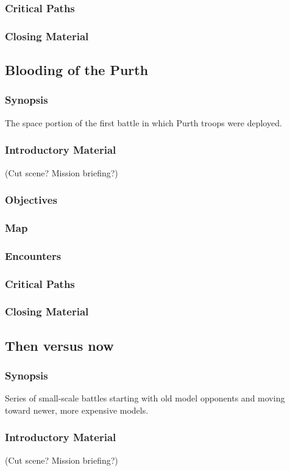 \subsubsection{Critical Paths}
\subsubsection{Closing Material}

\subsection{Blooding of the Purth}
\subsubsection{Synopsis}
The space portion of the first battle in which Purth troops were deployed.
\subsubsection{Introductory Material}
 (Cut scene?  Mission briefing?)
\subsubsection{Objectives}
\subsubsection{Map}
\subsubsection{Encounters}
\subsubsection{Critical Paths}
\subsubsection{Closing Material}

\subsection{Then versus now}
\subsubsection{Synopsis}
Series of small-scale battles starting with old model opponents and moving toward newer, more expensive models.
\subsubsection{Introductory Material}
 (Cut scene?  Mission briefing?)
